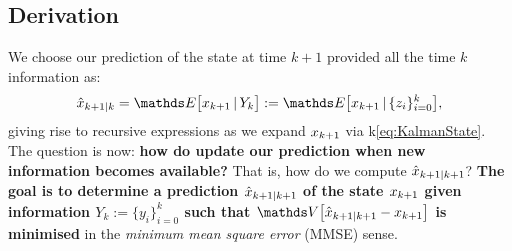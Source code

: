 \subsection{Derivation}

We choose our prediction of the state at time $k+1$ provided all the time $k$ information as:
\begin{equation}\label{eq:hatxkpk_definition}
\hatxkpk = \expect{\xkp\given Y_k} := \expect{\xkp\given\{ z_i\}_{i=0}^k},
\end{equation}
giving rise to recursive expressions as we expand $x_{k+1}$ via k\eqref{eq:KalmanState}.\\

The question is now: \textbf{how do update our prediction
when new information becomes available?} That is, how do we compute $\hat{x}_{k+1|k+1}$?
 \textbf{The goal is to determine a prediction $\hat{x}_{k+1|k+1}$ of the state $x_{k+1}$
given information $Y_k := \{ y_i\}_{i=0}^k$ such that $\covariance{\hatxkpkp - \xkp}$ is minimised} 
in the \emph{minimum mean square error} (MMSE) sense.\\

